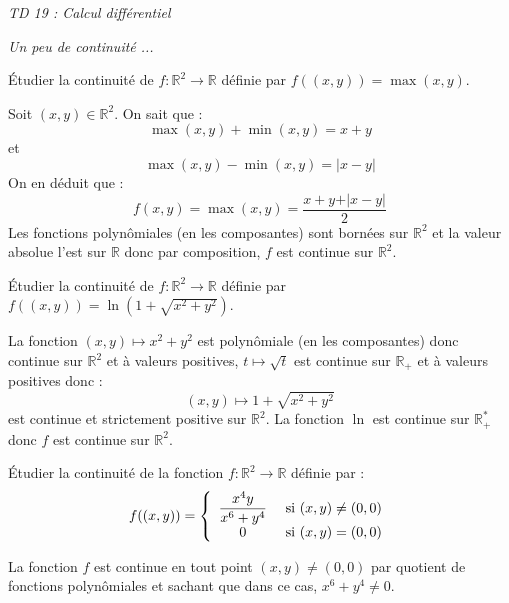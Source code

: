 \documentclass[a4paper,10pt]{report}
\begin{document}
\everymath{\displaystyle}

\begin{center}
\textit{{ {\huge TD 19 : Calcul différentiel}}}
\end{center}

\medskip

\medskip

\begin{center}
\textit{{ {\large Un peu de continuité ...}}}
\end{center}

\medskip


\begin{Exercice}{} Étudier la continuité de $f : \mathbb{R}^2 \rightarrow \mathbb{R}$ définie par $ f((x,y))=  \max(x,y)$.
\end{Exercice}

\corr Soit $(x,y) \in \mathbb{R}^2$. On sait que :
$$ \max(x,y)+ \min(x,y) = x+y$$
et 
$$ \max(x,y)-\min(x,y) = \vert x-y \vert$$
On en déduit que :
$$ f(x,y)= \max(x,y) = \dfrac{x+y+ \vert x-y \vert}{2}$$
Les fonctions polynômiales (en les composantes) sont bornées sur $\mathbb{R}^2$ et la valeur absolue l'est sur $\mathbb{R}$ donc par composition, $f$ est continue sur $\mathbb{R}^2$.

\begin{Exercice}{} Étudier la continuité de $f : \mathbb{R}^2 \rightarrow \mathbb{R}$ définie par $f((x,y))= \ln(1 + \sqrt{x^2+y^2})$.
\end{Exercice}

\corr La fonction $(x,y) \mapsto x^2+y^2$ est polynômiale (en les composantes) donc continue sur $\mathbb{R}^2$ et à valeurs positives, $t \mapsto \sqrt{t}$ est continue sur $\mathbb{R}_+$ et à valeurs positives donc :
$$ (x,y) \mapsto 1+ \sqrt{x^2+y^2}$$
est continue et strictement positive sur $\mathbb{R}^2$. La fonction $\ln$ est continue sur $\mathbb{R}_+^{*}$ donc $f$ est continue sur $\mathbb{R}^2$.

\begin{Exercice}{} Étudier la continuité de la fonction $f : \mathbb{R}^2 \rightarrow \mathbb{R}$ définie par :
$$ f((x,y)) = \left\lbrace \begin{array}{cl}
\dfrac{x^4 y}{x^6+y^4} & \hbox{ si } (x,y) \neq (0,0) \\
0 & \hbox{ si } (x,y)=(0,0) \\
\end{array}\right.$$
\end{Exercice}

\corr La fonction $f$ est continue en tout point $(x,y) \neq (0,0)$ par quotient de fonctions polynômiales et sachant que dans ce cas, $x^6+y^4 \neq 0$. 
\end{document}
